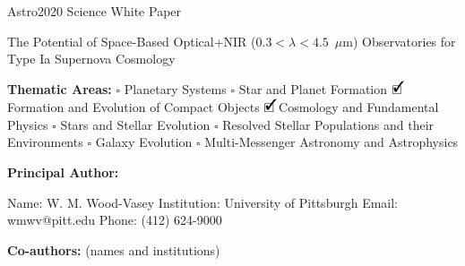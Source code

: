 \documentclass[12pt,preprint]{aastex}
\newcommand{\cmark}{\ding{51}}%
\newcommand{\done}{\rlap{$\square$}{\raisebox{2pt}{\large\hspace{1pt}\cmark}}%
\hspace{-2.5pt}}
\begin{document}
\raggedright
\huge
Astro2020 Science White Paper \linebreak

The Potential of Space-Based Optical+NIR ($0.3<\lambda<4.5$~$\mu$m) Observatories for Type Ia Supernova Cosmology \linebreak
\normalsize

\noindent \textbf{Thematic Areas:} \hspace*{60pt} $\square$ Planetary Systems \hspace*{10pt} $\square$ Star and Planet Formation \hspace*{20pt}\linebreak
$\done$ Formation and Evolution of Compact Objects \hspace*{31pt} $\done$ Cosmology and Fundamental Physics \linebreak
  $\square$  Stars and Stellar Evolution \hspace*{1pt}    $\square$ Resolved Stellar Populations and their Environments \hspace*{40pt} \linebreak
  $\square$    Galaxy Evolution   \hspace*{45pt}    $\square$ Multi-Messenger Astronomy and Astrophysics \hspace*{65pt} \linebreak

\textbf{Principal Author:}

Name: W. M. Wood-Vasey
 \linebreak
Institution: University of Pittsburgh
 \linebreak
Email: wmwv@pitt.edu
 \linebreak
Phone: (412) 624-9000
 \linebreak

\textbf{Co-authors:} (names and institutions)
  \linebreak
\end{document}
